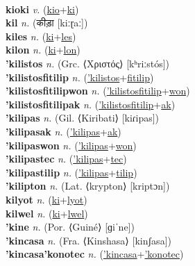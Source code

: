  \label{kiolon} \\
\textbf{kioki} \textit{v.} (\hyperref[kio]{kio}+\hyperref[ki]{ki})
 \label{kioki} \\
\textbf{kil} \textit{n.} ({\devanagari{}कीड़ा} [kiːɽaː])
 \label{kil} \\
\textbf{kiles} \textit{n.} (\hyperref[ki]{ki}+\hyperref[les]{les})
 \label{kiles} \\
\textbf{kilon} \textit{n.} (\hyperref[ki]{ki}+\hyperref[lon]{lon})
 \label{kilon} \\
\textbf{'kilistos} \textit{n.} (Grc. ⟨Χριστός⟩ [kʰriːstós])
 \label{'kilistos} \\
\textbf{'kilistosfitilip} \textit{n.} (\hyperref['kilistos]{'kilistos}+\hyperref[fitilip]{fitilip})
 \label{'kilistosfitilip} \\
\textbf{'kilistosfitilipwon} \textit{n.} (\hyperref['kilistosfitilip]{'kilistosfitilip}+\hyperref[won]{won})
 \label{'kilistosfitilipwon} \\
\textbf{'kilistosfitilipak} \textit{n.} (\hyperref['kilistosfitilip]{'kilistosfitilip}+\hyperref[ak]{ak})
 \label{'kilistosfitilipak} \\
\textbf{'kilipas} \textit{n.} (Gil. ⟨Kiribati⟩ [kiɾipas])
 \label{'kilipas} \\
\textbf{'kilipasak} \textit{n.} (\hyperref['kilipas]{'kilipas}+\hyperref[ak]{ak})
 \label{'kilipasak} \\
\textbf{'kilipaswon} \textit{n.} (\hyperref['kilipas]{'kilipas}+\hyperref[won]{won})
 \label{'kilipaswon} \\
\textbf{'kilipastec} \textit{n.} (\hyperref['kilipas]{'kilipas}+\hyperref[tec]{tec})
 \label{'kilipastec} \\
\textbf{'kilipastilip} \textit{n.} (\hyperref['kilipas]{'kilipas}+\hyperref[tilip]{tilip})
 \label{'kilipastilip} \\
\textbf{'kilipton} \textit{n.} (Lat. ⟨krypton⟩ [kriptɔn])
 \label{'kilipton} \\
\textbf{kilyot} \textit{n.} (\hyperref[ki]{ki}+\hyperref[lyot]{lyot})
 \label{kilyot} \\
\textbf{kilwel} \textit{n.} (\hyperref[ki]{ki}+\hyperref[lwel]{lwel})
 \label{kilwel} \\
\textbf{'kine} \textit{n.} (Por. ⟨Guiné⟩ [ɡiˈne])
 \label{'kine} \\
\textbf{'kincasa} \textit{n.} (Fra. ⟨Kinshasa⟩ [kinʃasa])
 \label{'kincasa} \\
\textbf{'kincasa'konotec} \textit{n.} (\hyperref['kincasa]{'kincasa}+\hyperref['konotec]{'konotec})
